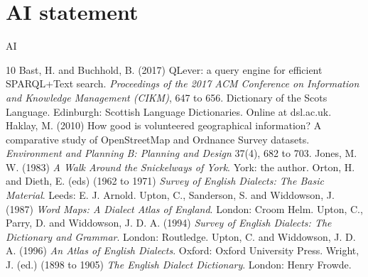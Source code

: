 \documentclass[11pt,a4paper]{article}
\begin{document}
\section*{AI statement}
{{AI}}

\begin{thebibliography}{10}
 Bast, H. and Buchhold, B. (2017) QLever: a query engine for efficient SPARQL+Text search. \textit{Proceedings of the 2017 ACM Conference on Information and Knowledge Management (CIKM)}, 647 to 656.
 Dictionary of the Scots Language. Edinburgh: Scottish Language Dictionaries. Online at dsl.ac.uk.
 Haklay, M. (2010) How good is volunteered geographical information? A comparative study of OpenStreetMap and Ordnance Survey datasets. \textit{Environment and Planning B: Planning and Design} 37(4), 682 to 703.
 Jones, M. W. (1983) \textit{A Walk Around the Snickelways of York}. York: the author.
 Orton, H. and Dieth, E. (eds) (1962 to 1971) \textit{Survey of English Dialects: The Basic Material}. Leeds: E. J. Arnold.
 Upton, C., Sanderson, S. and Widdowson, J. (1987) \textit{Word Maps: A Dialect Atlas of England}. London: Croom Helm.
 Upton, C., Parry, D. and Widdowson, J. D. A. (1994) \textit{Survey of English Dialects: The Dictionary and Grammar}. London: Routledge.
 Upton, C. and Widdowson, J. D. A. (1996) \textit{An Atlas of English Dialects}. Oxford: Oxford University Press.
 Wright, J. (ed.) (1898 to 1905) \textit{The English Dialect Dictionary}. London: Henry Frowde.
\end{thebibliography}
\end{document}

